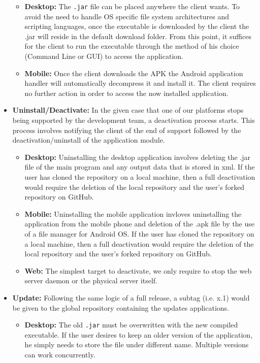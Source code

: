 \documentclass[12pt]{report}
\begin{document}
\begin{itemize}
       \begin{itemize}
       	\item \textbf{Desktop:} The \texttt{.jar} file can be placed anywhere the client wants. To avoid the need to handle OS specific file system architectures and scripting languages, once the executable is downloaded by the client the .jar will reside in the default download folder. From this point, it suffices for the client to run the executable through the method of his choice (Command Line or GUI) to access the application.
       	\item \textbf{Mobile:} Once the client downloads the APK the Android application handler will automatically decompress it and install it. The client requires no further action in order to access the now installed application.
       \end{itemize}
    \item \textbf{Uninstall/Deactivate:} In the given case that one of our platforms stops being supported by the development team, a deactivation process starts. This process involves notifying the client of the end of support followed by the deactivation/uninstall of the application module.
    \begin{itemize}
    	\item \textbf{Desktop:} Uninstalling the desktop application involves deleting the .jar file of the main program and any output data that is stored in xml. If the user has cloned the repository on a local machine, then a full deactivation would require the deletion of the local repository and the user's forked repository on GitHub.
    	\item \textbf{Mobile:} Uninstalling the mobile application invloves uninstalling the application from the mobile phone and deletion of the .apk file by the use of a file manager for Android OS. If the user has cloned the repository on a local machine, then a full deactivation would require the deletion of the local repository and the user's forked repository on GitHub.
    	\item \textbf{Web:} The simplest target to deactivate, we only require to stop the web server daemon or the physical server itself.
    \end{itemize}
    \item \textbf{Update:} Following the same logic of a full release, a subtag (i.e. x.1) would be given to the global repository containing the updates applications. 
    \begin{itemize}
        \item \textbf{Desktop:} The old \texttt{.jar} must be overwritten with the new compiled executable. If the user desires to keep an older version of the application, he simply needs to store the file under different name. Multiple versions can work concurrently.

\end{itemize}
\end{itemize}
\end{document}
